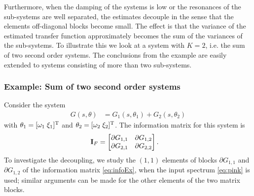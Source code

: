Furthermore, when the damping of the systems is low or the resonances of the sub-systems are well separated, the estimates decouple in the sense that the elements off-diagonal blocks become small.
The effect is that the variance of the estimated transfer function approximately becomes the sum of the variances of the sub-systems.
To illustrate this we look at a system with $K=2$, i.e. the sum of two second order systems.
The conclusions from the example are easily extended to systems consisting of more than two sub-systems.

\subsubsection{Example: Sum of two second order systems}
Consider the system
\begin{align}
G(s,\theta) &= G_1(s,\theta_1) + G_2(s,\theta_2)%
\end{align}
with $\theta_1=[\omega_1\;\xi_1]^{\mathrm{T}}$ and $\theta_2=[\omega_2\;\xi_2]^{\mathrm{T}}$.
The information matrix for this system is
\begin{align}
\mathbf{I}_F &=
       \begin{bmatrix}
         \partial G_{1,1}  & \partial G_{1,2}\\
         \partial G_{2,1}  & \partial G_{2,2}
       \end{bmatrix}.
\label{eq:infoEx}
\end{align}
To investigate the decoupling, we study the $(1,1)$ elements of blocks $\partial G_{1,1}$ and $\partial G_{1,2}$ of the information matrix \eqref{eq:infoEx}, when the input spectrum \eqref{eq:pink} is used; similar arguments can be made for the other elements of the two matrix blocks.

